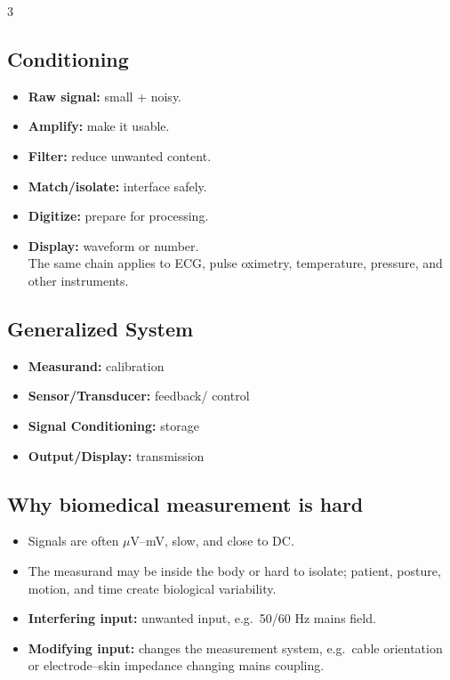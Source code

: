 \documentclass[10pt,a4paper]{ctexart}
\newcommand{\key}[1]{\textbf{#1}}
\begin{document}
\begin{multicols*}{3}
\subsection{Conditioning}
\begin{itemize}
  \item \key{Raw signal:} small + noisy.
  \item \key{Amplify:} make it usable. 
  \item \key{Filter:} reduce unwanted content.
  \item \key{Match/isolate:} interface safely. 
  \item \key{Digitize:} prepare for processing.
  \item \key{Display:} waveform or number. \\
  The same chain applies to ECG, pulse oximetry, temperature, pressure, and other instruments.
\end{itemize}

\subsection{Generalized System}
\begin{itemize}
    \item \key{Measurand:} calibration
    \item \key{Sensor/Transducer:} feedback/ control
    \item \key{Signal Conditioning:} storage
    \item \key{Output/Display:} transmission
\end{itemize}

\subsection{Why biomedical measurement is hard}
\begin{itemize}
  \item Signals are often $\mu$V--mV, slow, and close to DC.
  \item The measurand may be inside the body or hard to isolate; patient,
  posture, motion, and time create biological variability.
  \item \key{Interfering input:} unwanted input, e.g.\ 50/60 Hz mains field.
  \item \key{Modifying input:} changes the measurement system, e.g.\ cable
  orientation or electrode--skin impedance changing mains coupling.
\end{itemize}


\end{multicols*}
\end{document}
